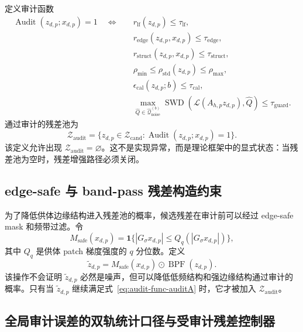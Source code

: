 \documentclass[11pt,a4paper,UTF8,fontset=fandol]{ctexart}
\theoremstyle{definition}
\DeclareMathOperator{\SWD}{SWD}
\DeclareMathOperator{\Audit}{Audit}
\DeclareMathOperator{\BPF}{BPF}
\newcommand{\cZ}{\mathcal{Z}}
\newcommand{\one}{\mathbf{1}}
\begin{document}
定义审计函数
\begin{equation}
\label{eq:audit-func-auditA}
\begin{aligned}
    \Audit(z_{d,p};x_{d,p})=1
    \quad\Longleftrightarrow\quad
    &r_{\mathrm{lf}}(z_{d,p})\le\tau_{\mathrm{lf}},\\
    &r_{\mathrm{edge}}(z_{d,p},x_{d,p})\le\tau_{\mathrm{edge}},\\
    &r_{\mathrm{struct}}(z_{d,p},x_{d,p})\le\tau_{\mathrm{struct}},\\
    &\rho_{\min}\le\rho_{\mathrm{std}}(z_{d,p})\le\rho_{\max},\\
    &\epsilon_{\mathrm{cal}}(z_{d,p};b)\le\tau_{\mathrm{cal}},\\
    &\max_{\widehat Q\in\widehat{\mathcal Q}_{\mathrm{noise}}^{(b)}}\SWD(\mathcal L(A_{h,p}z_{d,p}),\widehat Q)\le\tau_{\mathrm{guard}}.
\end{aligned}
\end{equation}
通过审计的残差池为
\begin{equation}
\label{eq:zaudit-auditA}
    \cZ_{\mathrm{audit}}
    =\{z_{d,p}\in\cZ_{\mathrm{cand}}:\Audit(z_{d,p};x_{d,p})=1\}.
\end{equation}
该定义允许出现 $\cZ_{\mathrm{audit}}=\varnothing$。这不是实现异常，而是理论框架中的显式状态：当残差池为空时，残差增强路径必须关闭。

\subsection{edge-safe 与 band-pass 残差构造约束}

为了降低供体边缘结构进入残差池的概率，候选残差在审计前可以经过 edge-safe mask 和频带过滤。令
\begin{equation}
    M_{\mathrm{safe}}(x_{d,p})
    =\one\{|G_\sigma x_{d,p}|\le Q_q(|G_\sigma x_{d,p}|)\},
\end{equation}
其中 $Q_q$ 是供体 patch 梯度强度的 $q$ 分位数。定义
\begin{equation}
    \tilde z_{d,p}=M_{\mathrm{safe}}(x_{d,p})\odot \BPF(z_{d,p}).
\end{equation}
该操作不会证明 $\tilde z_{d,p}$ 必然是噪声，但可以降低低频结构和强边缘结构通过审计的概率。只有当 $\tilde z_{d,p}$ 继续满足式~\eqref{eq:audit-func-auditA} 时，它才被加入 $\cZ_{\mathrm{audit}}$。


\subsection{全局审计误差的双轨统计口径与受审计残差控制器}
\end{document}
